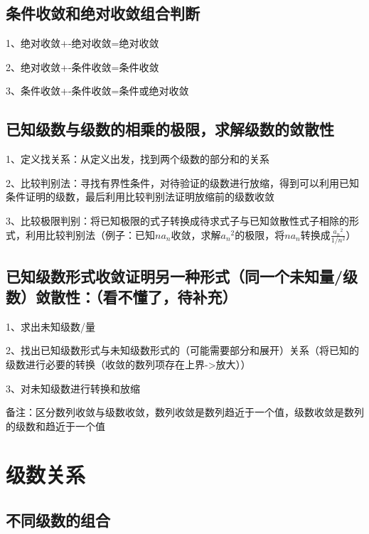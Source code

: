 \subsection{条件收敛和绝对收敛组合判断}

1、绝对收敛+-绝对收敛=绝对收敛

2、绝对收敛+-条件收敛=条件收敛

3、条件收敛+-条件收敛=条件或绝对收敛



\subsection{已知级数与级数的相乘的极限，求解级数的敛散性}

1、定义找关系：从定义出发，找到两个级数的部分和的关系

2、比较判别法：寻找有界性条件，对待验证的级数进行放缩，得到可以利用已知条件证明的级数，最后利用比较判别法证明放缩前的级数收敛

3、比较极限判别：将已知极限的式子转换成待求式子与已知敛散性式子相除的形式，利用比较判别法（例子：已知$na_n$收敛，求解${a_n}^2$的极限，将$na_n$转换成$\frac{{a_n}^2}{ 1/n^2 }$）



\subsection{已知级数形式收敛证明另一种形式（同一个未知量/级数）敛散性：（看不懂了，待补充）}

1、求出未知级数/量

2、找出已知级数形式与未知级数形式的（可能需要部分和展开）关系（将已知的级数进行必要的转换（收敛的数列项存在上界->放大））

3、对未知级数进行转换和放缩



备注：区分数列收敛与级数收敛，数列收敛是数列趋近于一个值，级数收敛是数列的级数和趋近于一个值

\section{级数关系}



\subsection{不同级数的组合}

